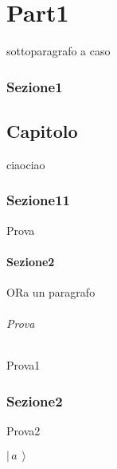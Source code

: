 \documentclass[border=10pt]{book}
\newcommand{\ket}[1]{\ensuremath{\left|\,#1\,\right\rangle}}
\begin{document}
\part{Part1}

\subparagraph{sottoparagrafo a caso}

\section*{Sezione1}

\chapter{Capitolo}
ciaociao
\section{Sezione11}
Prova
\subsection[Boh è per l'indice]{Sezione2}
ORa un paragrafo
\paragraph{Prova}
Prova1

\section{Sezione2}
Prova2

$\ket{a}$
\end{document}
